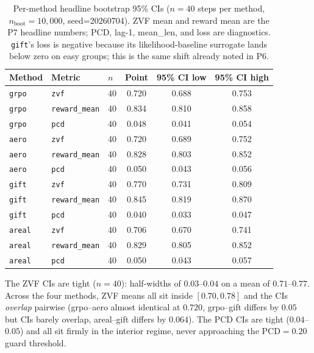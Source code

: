 \begin{table}[t]
\centering
\caption{Per-method headline bootstrap 95\% CIs
($n{=}40$ steps per method,
$n_{\text{boot}}{=}10{,}000$, seed=20260704). ZVF mean and reward
mean are the P7 headline numbers; PCD, lag-1, mean\_len, and loss
are diagnostics. \texttt{gift}'s loss is negative because its
likelihood-baseline surrogate lands below zero on easy groups; this
is the same shift already noted in P6.}
\label{tab:p7-headline-cis}
\begin{tabular}{lllccc}
\toprule
Method & Metric & $n$ & Point & 95\% CI low & 95\% CI high \\
\midrule
\texttt{grpo}  & \texttt{zvf}          & 40 & 0.720 & 0.688 & 0.753 \\
\texttt{grpo}  & \texttt{reward\_mean} & 40 & 0.834 & 0.810 & 0.858 \\
\texttt{grpo}  & \texttt{pcd}          & 40 & 0.048 & 0.041 & 0.054 \\
\texttt{aero}  & \texttt{zvf}          & 40 & 0.720 & 0.689 & 0.752 \\
\texttt{aero}  & \texttt{reward\_mean} & 40 & 0.828 & 0.803 & 0.852 \\
\texttt{aero}  & \texttt{pcd}          & 40 & 0.050 & 0.043 & 0.056 \\
\texttt{gift}  & \texttt{zvf}          & 40 & 0.770 & 0.731 & 0.809 \\
\texttt{gift}  & \texttt{reward\_mean} & 40 & 0.845 & 0.819 & 0.870 \\
\texttt{gift}  & \texttt{pcd}          & 40 & 0.040 & 0.033 & 0.047 \\
\texttt{areal} & \texttt{zvf}          & 40 & 0.706 & 0.670 & 0.741 \\
\texttt{areal} & \texttt{reward\_mean} & 40 & 0.829 & 0.805 & 0.852 \\
\texttt{areal} & \texttt{pcd}          & 40 & 0.050 & 0.043 & 0.057 \\
\bottomrule
\end{tabular}
\end{table}

The ZVF CIs are tight ($n{=}40$): half-widths of $0.03$--$0.04$
on a mean of $0.71$--$0.77$. Across the four methods, ZVF means
all sit inside $[0.70, 0.78]$ and the CIs \emph{overlap} pairwise
(grpo--aero almost identical at $0.720$, grpo--gift differs by
$0.05$ but CIs barely overlap, areal--gift differs by $0.064$).
The PCD CIs are tight ($0.04$--$0.05$) and all sit firmly in the
interior regime, never approaching the $\mathrm{PCD} = 0.20$ guard
threshold.

